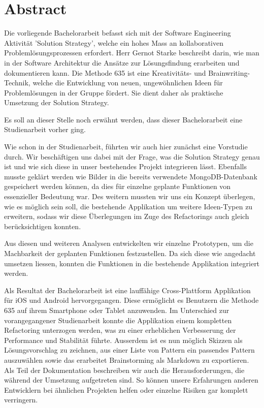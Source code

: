 \thispagestyle{empty}
\section*{Abstract}
Die vorliegende Bachelorarbeit befasst sich mit der Software Engineering Aktivität 'Solution Strategy', welche ein hohes Mass an kollaborativen Problemlösungsprozessen erfordert. Herr Gernot Starke beschreibt darin, wie man in der Software Architektur die Ansätze zur Lösungsfindung erarbeiten und dokumentieren kann. Die Methode 635 ist eine Kreativitäts- und Brainwriting-Technik, welche die Entwicklung von neuen, ungewöhnlichen Ideen für Problemlösungen in der Gruppe fördert. Sie dient daher als praktische Umsetzung der Solution Strategy.

Es soll an dieser Stelle noch erwähnt werden, dass dieser Bachelorarbeit eine Studienarbeit \cite{methode635-sa} vorher ging.

Wie schon in der Studienarbeit, führten wir auch hier zunächst eine Vorstudie durch. Wir beschäftigen uns dabei mit der Frage, was die Solution Strategy genau ist und wie sich diese in unser bestehendes Projekt integrieren lässt. Ebenfalls musste geklärt werden wie Bilder in die bereits verwendete MongoDB-Datenbank gespeichert werden können, da dies für einzelne geplante Funktionen von essenzieller Bedeutung war. Des weitern mussten wir uns ein Konzept überlegen, wie es möglich sein soll, die bestehende Applikation um weitere Ideen-Typen zu erweitern, sodass wir diese Überlegungen im Zuge des Refactorings auch gleich berücksichtigen konnten. 

Aus diesen und weiteren Analysen entwickelten wir einzelne Prototypen, um die Machbarkeit der geplanten Funktionen festzustellen. Da sich diese wie angedacht umsetzen liessen, konnten die Funktionen in die bestehende Applikation integriert werden. 

Als Resultat der Bachelorarbeit ist eine lauffähige Cross-Plattform Applikation für iOS und Android hervorgegangen. Diese ermöglicht es Benutzern die Methode 635 auf ihrem Smartphone oder Tablet anzuwenden. Im Unterschied zur vorangegangener Studienarbeit konnte die Applikation einem kompletten Refactoring unterzogen werden, was zu einer erheblichen Verbesserung der Performance und Stabilität führte. Ausserdem ist es nun möglich Skizzen als Lösungsvorschlag zu zeichnen, aus einer Liste von Pattern ein passendes Pattern auszuwählen sowie das erarbeitet Brainstorming als Markdown zu exportieren. Als Teil der Dokumentation beschreiben wir auch die Herausforderungen, die während der Umsetzung aufgetreten sind. So können unsere Erfahrungen anderen Entwicklern bei ähnlichen Projekten helfen oder einzelne Risiken gar komplett verringern.   